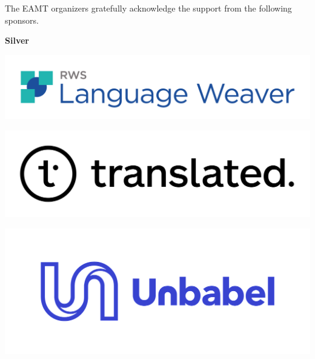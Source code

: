 \documentclass[11pt,oneside]{book}
\begin{document}

\pagebreak

\setcounter{page}{2}
{}
\noindent


{\Large The EAMT organizers gratefully acknowledge the support from the following sponsors.}
\bigskip

\vspace*{0.5cm}


    \begin{samepage}
  \noindent
  {\Large \textbf{Silver}}

  \nopagebreak
            \begin{minipage}[c][0.21\linewidth][c]{0.30\linewidth}
        \includegraphics[width=\linewidth]{eamt_volume_1/sponsor_logos/language_weaver.pdf}
      \end{minipage}\hspace{0.05\linewidth}
          \begin{minipage}[c][0.21\linewidth][c]{0.30\linewidth}
        \includegraphics[width=\linewidth]{eamt_volume_1/sponsor_logos/Logo_Translated_Primary.png}
      \end{minipage}\hspace{0.05\linewidth}
          \begin{minipage}[c][0.21\linewidth][c]{0.30\linewidth}
        \includegraphics[width=\linewidth]{eamt_volume_1/sponsor_logos/Unbabel logo.png}
      \end{minipage}\hspace{0.05\linewidth}
    
    \end{samepage}
\end{document}
